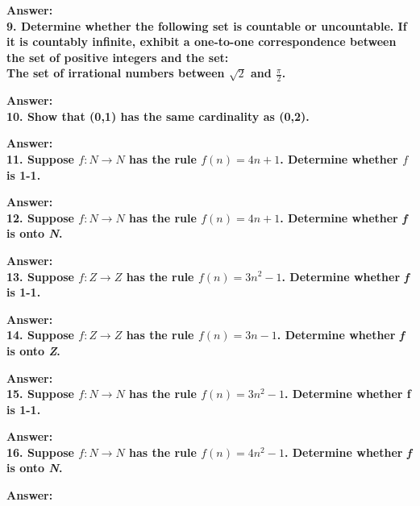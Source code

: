 \documentclass{article}
\begin{document}
\begin{large}
\textbf{Answer:} \\




\textbf{9. Determine whether the following set is countable or uncountable. If it is countably infinite, exhibit a one-to-one correspondence between the set of positive integers and the set:\\
The set of irrational numbers between $\sqrt{2}$ and $\frac{\pi}{2}$.}

\textbf{Answer:} \\





\textbf{10. Show that (0,1) has the same cardinality as (0,2).}

\textbf{Answer:} \\




\textbf{11. Suppose $f:N\to N$ has the rule $f(n)=4n+1$. Determine whether $f$ is 1-1.}

\textbf{Answer:} \\




\textbf{12. Suppose $f:N\to N$ has the rule $f(n)=4n+1$. Determine whether \emph{f} is onto \emph{N}.}

\textbf{Answer:} \\




\textbf{13. Suppose $f:Z\to Z$ has the rule $f(n)=3{n^{2}}-1$. Determine whether \emph{f} is 1-1.}

\textbf{Answer:} \\




\textbf{14. Suppose $f:Z\to Z$ has the rule $f(n)=3n-1$. Determine whether \emph{f} is onto \emph{Z}.}

\textbf{Answer:} \\




\textbf{15. Suppose $f:N\to N$ has the rule $f(n)=3{n^{2}}-1$. Determine whether f is 1-1.}

\textbf{Answer:} \\




\textbf{16. Suppose $f:N\to N$ has the rule $f(n)=4{n^{2}-1}$. Determine whether \emph{f} is onto \emph{N}.}

\textbf{Answer:} \\






\end{large}
\end{document}
